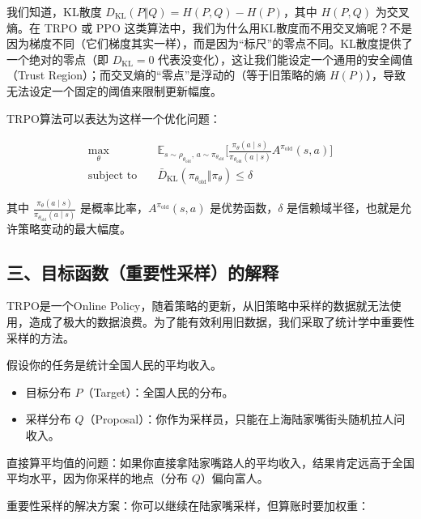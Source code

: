 我们知道，KL散度 \(D_{\mathrm{KL}}(P\Vert Q)=H(P,Q)-H(P)\)，其中 \(H(P,Q)\) 为交叉熵。在 TRPO 或 PPO 这类算法中，我们为什么用KL散度而不用交叉熵呢？不是因为梯度不同（它们梯度其实一样），而是因为``标尺''的零点不同。KL散度提供了一个绝对的零点（即 \(D_{\mathrm{KL}}=0\) 代表没变化），这让我们能设定一个通用的安全阈值（Trust Region）；而交叉熵的``零点''是浮动的（等于旧策略的熵 \(H(P)\)），导致无法设定一个固定的阈值来限制更新幅度。

TRPO算法可以表达为这样一个优化问题：

\[
\begin{aligned}
\max_\theta\quad
& \mathbb{E}_{s\sim\rho_{\theta_{\mathrm{old}}},\,a\sim\pi_{\theta_{\mathrm{old}}}}
\bigl[
\frac{\pi_\theta(a\mid s)}{\pi_{\theta_{\mathrm{old}}}(a\mid s)}
A^{\pi_{\mathrm{old}}}(s,a)
\bigr] \\
\text{subject to}\quad
& \bar{D}_{\mathrm{KL}}(\pi_{\theta_{\mathrm{old}}}\Vert \pi_\theta)\le \delta
\end{aligned}
\]

其中 \(\frac{\pi_\theta(a\mid s)}{\pi_{\theta_{\mathrm{old}}}(a\mid s)}\) 是概率比率，\(A^{\pi_{\mathrm{old}}}(s,a)\) 是优势函数，\(\delta\) 是信赖域半径，也就是允许策略变动的最大幅度。

\hypertarget{ux4e09ux76eeux6807ux51fdux6570ux91cdux8981ux6027ux91c7ux6837ux7684ux89e3ux91ca}{%
\subsection{三、目标函数（重要性采样）的解释}\label{ux4e09ux76eeux6807ux51fdux6570ux91cdux8981ux6027ux91c7ux6837ux7684ux89e3ux91ca}}

TRPO是一个Online Policy，随着策略的更新，从旧策略中采样的数据就无法使用，造成了极大的数据浪费。为了能有效利用旧数据，我们采取了统计学中重要性采样的方法。

假设你的任务是统计全国人民的平均收入。

\begin{itemize}
\tightlist
\item
  目标分布 \(P\)（Target）：全国人民的分布。
\item
  采样分布 \(Q\)（Proposal）：你作为采样员，只能在上海陆家嘴街头随机拉人问收入。
\end{itemize}

直接算平均值的问题：如果你直接拿陆家嘴路人的平均收入，结果肯定远高于全国平均水平，因为你采样的地点（分布 \(Q\)）偏向富人。

重要性采样的解决方案：你可以继续在陆家嘴采样，但算账时要加权重：

